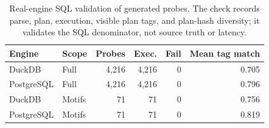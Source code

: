 \begin{table}[t]
\centering
\caption{Real-engine SQL validation of generated probes. The check records parse, plan, execution, visible plan tags, and plan-hash diversity; it validates the SQL denominator, not source truth or latency.}
\label{tab:real-engine-validation}
\small
\begin{tabular}{llrrrr}
\toprule
Engine & Scope & Probes & Exec. & Fail & Mean tag match \\
\midrule
DuckDB & Full & 4,216 & 4,216 & 0 & 0.705 \\
PostgreSQL & Full & 4,216 & 4,216 & 0 & 0.796 \\
DuckDB & Motifs & 71 & 71 & 0 & 0.756 \\
PostgreSQL & Motifs & 71 & 71 & 0 & 0.819 \\
\bottomrule
\end{tabular}
\end{table}
